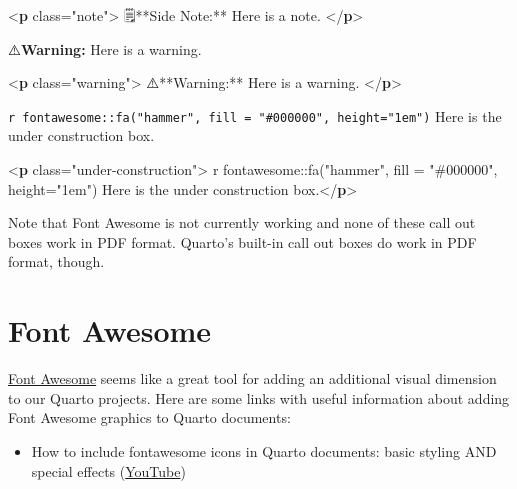 \documentclass[
  letterpaper,
  DIV=11,
  numbers=noendperiod]{scrreprt}
\newenvironment{Shaded}{\begin{snugshade}}{\end{snugshade}}
\newcommand{\DataTypeTok}[1]{\textcolor[rgb]{0.68,0.00,0.00}{#1}}
\newcommand{\KeywordTok}[1]{\textcolor[rgb]{0.00,0.23,0.31}{\textbf{#1}}}
\newcommand{\NormalTok}[1]{\textcolor[rgb]{0.00,0.23,0.31}{#1}}
\newcommand{\OperatorTok}[1]{\textcolor[rgb]{0.37,0.37,0.37}{#1}}
\newcommand{\OtherTok}[1]{\textcolor[rgb]{0.00,0.23,0.31}{#1}}
\newcommand{\StringTok}[1]{\textcolor[rgb]{0.13,0.47,0.30}{#1}}
\providecommand{\tightlist}{%
  \setlength{\itemsep}{0pt}\setlength{\parskip}{0pt}}\usepackage{longtable,booktabs,array}
\begin{document}
\begin{Shaded}
\begin{Highlighting}[]
\DataTypeTok{\textless{}}\KeywordTok{p}\OtherTok{ class}\OperatorTok{=}\StringTok{"note"}\DataTypeTok{\textgreater{}}\NormalTok{ 🗒**Side Note:** Here is a note. }\DataTypeTok{\textless{}/}\KeywordTok{p}\DataTypeTok{\textgreater{}}
\end{Highlighting}
\end{Shaded}

⚠️\textbf{Warning:} Here is a warning.

\begin{Shaded}
\begin{Highlighting}[]
\DataTypeTok{\textless{}}\KeywordTok{p}\OtherTok{ class}\OperatorTok{=}\StringTok{"warning"}\DataTypeTok{\textgreater{}}\NormalTok{ ⚠️**Warning:** Here is a warning. }\DataTypeTok{\textless{}/}\KeywordTok{p}\DataTypeTok{\textgreater{}}
\end{Highlighting}
\end{Shaded}

\texttt{r\ fontawesome::fa("hammer",\ fill\ =\ "\#000000",\ height="1em")}
Here is the under construction box.

\begin{Shaded}
\begin{Highlighting}[]
\DataTypeTok{\textless{}}\KeywordTok{p}\OtherTok{ class}\OperatorTok{=}\StringTok{"under{-}construction"}\DataTypeTok{\textgreater{}}\NormalTok{ \textasciigrave{}r fontawesome::fa("hammer", fill = "\#000000", height="1em")\textasciigrave{} Here is the under construction box.}\DataTypeTok{\textless{}/}\KeywordTok{p}\DataTypeTok{\textgreater{}}
\end{Highlighting}
\end{Shaded}

Note that Font Awesome is not currently working and none of these call
out boxes work in PDF format. Quarto's built-in call out boxes do work
in PDF format, though.

\section{Font Awesome}\label{font-awesome}

\href{https://fontawesome.com/}{Font Awesome} seems like a great tool
for adding an additional visual dimension to our Quarto projects. Here
are some links with useful information about adding Font Awesome
graphics to Quarto documents:

\begin{itemize}
\tightlist
\item
  How to include fontawesome icons in Quarto documents: basic styling
  AND special effects
  (\href{https://www.youtube.com/watch?v=u8EOVOjX13Y}{YouTube})
\end{itemize}
\end{document}
